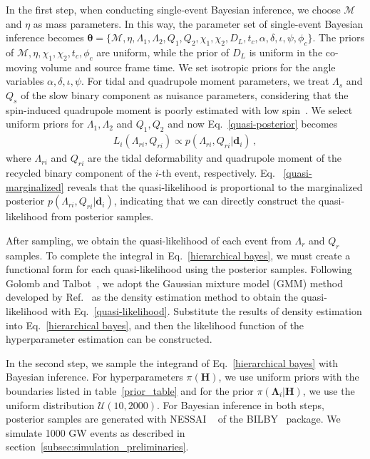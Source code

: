 \documentclass[a4paper,11pt]{article}
\begin{document}
In the first step, when conducting single-event Bayesian inference, we choose 
$\mathcal{M}$ and $\eta$ as mass parameters. In this way, the parameter set of 
single-event Bayesian inference becomes $\bm{\theta} = \{\mathcal{M},\eta,
\Lambda_1,\Lambda_2,Q_1,Q_2,\chi_1,\chi_2,D_L,t_c,\alpha,\delta,\iota,\psi,\phi_c\}
$. The priors of $\mathcal{M},\eta,\chi_1,\chi_2,t_c,\phi_c$ are uniform, while 
the prior of $D_L$ is uniform in the co-moving volume and source frame time. We 
set isotropic priors for the angle variables $\alpha,\delta,\iota,\psi$. For tidal 
and quadrupole moment parameters, we treat $\Lambda_s$ and $Q_s$ of the slow 
binary component as nuisance parameters, considering that the spin-induced 
quadrupole moment is poorly estimated with low spin~\cite{Yagi:2013awa}. We select 
uniform priors for $\Lambda_1,\Lambda_2$ and $Q_1,Q_2$ and now Eq.~\eqref{quasi-posterior} becomes
\begin{equation}
    \label{quasi-marginalized1}
    \begin{aligned}
        L_i(\Lambda_{ri},Q_{ri}) \propto p(\Lambda_{ri},Q_{ri}|\bm{d}_i)\,,
    \end{aligned}  
\end{equation}
where $\Lambda_{ri}$ and $Q_{ri}$ are the tidal deformability and quadrupole 
moment of the recycled binary component of the $i$-th event, respectively. Eq.
~\eqref{quasi-marginalized} reveals that the quasi-likelihood is proportional to 
the marginalized posterior $p(\Lambda_{ri},Q_{ri}|\bm{d}_i)$, indicating that we 
can directly construct the quasi-likelihood from posterior samples.

After sampling, we obtain the quasi-likelihood of each event from $\Lambda_r$ and 
$Q_r$ samples. To complete the integral in Eq.~\eqref{hierarchical bayes}, we must 
create a functional form for each quasi-likelihood using the posterior samples. 
Following Golomb and Talbot~\cite{Golomb:2021tll}, we adopt the Gaussian mixture 
model (GMM) method developed by Ref.~\cite{Talbot:2020oeu} as the density 
estimation method to obtain the quasi-likelihood with Eq.~\eqref{quasi-likelihood}. 
Substitute the results of density estimation into Eq.~\eqref{hierarchical bayes}, 
and then the likelihood function of the hyperparameter estimation can be constructed.

In the second step, we sample the integrand of Eq.~\eqref{hierarchical bayes} with 
Bayesian inference. For hyperparameters $\pi(\bm{H})$, we use uniform priors with 
the boundaries listed in table~\ref{prior_table} and for the prior $\pi(\bm
{\Lambda}_i|\bm{H})$, we use the uniform distribution $\mathcal{U}(10,2000)$. For 
Bayesian inference in both steps, posterior samples are generated with {\sc NESSAI}
~\cite{Skilling:2004pqw,Skilling:2006gxv,michael_j_williams_2025_14627250,PhysRevD.103.103006,Williams:2023ppp} 
of the {\sc BILBY}~\cite{Ashton:2018jfp} package. We simulate 1000 GW events as 
described in section~\ref{subsec:simulation_preliminaries}. 
\end{document}
